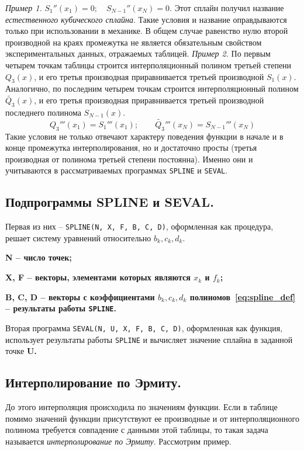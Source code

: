\documentclass[../../calc-math-exam-2023.tex]{subfiles}
\begin{document}
    \emph{Пример 1.} $\displaystyle S_1''(x_1) = 0; \quad S_{N-1}''(x_N) = 0$. Этот сплайн получил название
    \emph{естественного кубического сплайна}. Такие условия и название оправдываются только при использовании в механике.
    В общем случае равенство нулю второй производной на краях промежутка не является обязательным свойством
    экспериментальных данных, отражаемых таблицей.
    \emph{Пример 2.} По первым четырем точкам таблицы строится интерполяционный полином третьей степени
    $Q_3(x)$, и его третья производная приравнивается третьей производной $S_1(x)$. Аналогично, по
    последним четырем точкам строится интерполяционный полином $\tilde{Q_3}(x)$, и его третья
    производная приравнивается третьей производной последнего полинома $S_{N-1}(x)$.
    \begin{equation*}
        \displaystyle Q_3'''(x_1) = S_1'''(x_1); \qquad \tilde{Q_3}'''(x_N) = S_{N-1}'''(x_N)
    \end{equation*}
    Такие условия не только отвечают характеру поведения функции в начале и в конце промежутка интерполирования,
    но и достаточно просты (третья производная от полинома третьей степени постоянна). Именно они и
    учитываются в рассматриваемых программах \verb|SPLINE| и \verb|SEVAL|.

    \subsection{Подпрограммы \bf{SPLINE} и \bf{SEVAL}.}
    Первая из них -- \verb|SPLINE(N, X, F, B, C, D)|, оформленная как процедура, решает систему
    уравнений относительно $b_k, c_k, d_k$.

    \bf{N} -- число точек;

    \bf{X}, \bf{F} -- векторы, элементами которых являются $x_k$ и $f_k$;

    \bf{B}, \bf{C}, \bf{D} -- векторы с коэффициентами $b_k, c_k, d_k$ полиномов~\eqref{eq:spline_def} --
    результаты работы \verb|SPLINE|.
    \vspace{10pt}

    Вторая программа \verb|SEVAL(N, U, X, F, B, C, D)|, оформленная как функция, использует
    результаты работы \verb|SPLINE| и вычисляет значение сплайна в заданной точке \bf{U}.

    \subsection{Интерполирование по Эрмиту.}
    До этого интерполяция происходила по значениям функции. Если в таблице помимо значений функции
    присутствуют ее производные и от интерполяционного полинома требуется совпадение с данными этой
    таблицы, то такая задача называется \emph{интерполирование по Эрмиту}. Рассмотрим пример.
\end{document}
